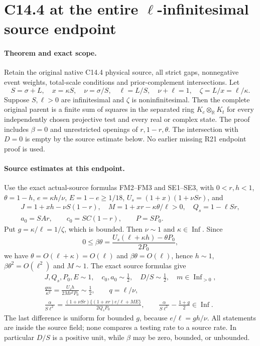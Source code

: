 \section{C14.4 at the entire $\ell$-infinitesimal source endpoint}
\label{sec:c144-ell-endpoint-rederived}

\paragraph{Theorem and exact scope.}
Retain the original native C14.4 physical source, all strict gaps,
nonnegative event weights, total-scale conditions and prior-complement
intersections.  Let
\[
 S=\sigma+L,\quad x=\kappa S,\quad
 \nu=\sigma/S,\quad\ell=L/S,\quad\nu+\ell=1,
 \quad\zeta=L/x=\ell/\kappa.
\]
Suppose $S,\ell>0$ are infinitesimal and $\zeta$ is
noninfinitesimal.  Then the complete original parent is a finite
sum of squares in the separated ring
$K_c\otimes_{\mathbb R}K_t$ for every independently chosen
projective test and every real or complex state.  The proof includes
$\beta=0$ and unrestricted openings of $r,1-r,\theta$.
The intersection with $D=0$ is empty by the source estimate below.
No earlier missing R21 endpoint proof is used.

\paragraph{Source estimates at this endpoint.}
Use the exact actual-source formulas FM2--FM3 and SE1--SE3, with
$0<r,h<1$, $\theta=1-h$, $e=\kappa h/\nu$, $E=1-e\ge1/18$,
$U_s=(1+x)(1+\nu Sr)$, and
\[
\begin{gathered}
 J=1+xh-\nu S(1-r),\quad
 M=1+xr-\kappa\theta/\ell>0,\quad Q_s=1-\ell Sr,\\
 a_0=SAr,\qquad c_0=SC(1-r),\qquad P=SP_0.
\end{gathered}
\]
Put $g=\kappa/\ell=1/\zeta$, which is bounded.
Then $\nu\sim1$ and $\kappa\in\operatorname{Inf}$.
Since
\[
 0\le\beta\theta
  =\frac{U_s(\ell+\kappa h)-\theta P_0}{2P_0},
\]
we have $\theta=O(\ell+\kappa)=O(\ell)$ and
$\beta\theta=O(\ell)$, hence $h\sim1$,
$\beta\theta^2=O(\ell^2)$ and $M\sim1$.
The exact source formulas give
\[
\begin{gathered}
 J,Q_s,P_0,E\sim1,\quad c_0,a_0\sim\tfrac12,
 \quad D/S\sim\tfrac12,\quad m\in\operatorname{Inf}_{>0},\\
 \frac{qm}{\kappa^2}
   =\frac{U_s h}{2M\nu^2P_0}\sim\tfrac12,
 \qquad q=\ell/\nu,\\
 \frac{\alpha}{S\ell^2}
   =\frac{(1+\nu Sr)\{(1+xr)e/\ell+ME\}}{2Q_sP_0},
 \qquad
 \frac{\alpha}{S\ell^2}-\frac{1+g}{2}\in\operatorname{Inf}.
\end{gathered}                                                   \tag{EL0a}
\]
The last difference is uniform for bounded $g$, because
$e/\ell=gh/\nu$.  All statements are inside the source field;
none compares a testing rate to a source rate.  In particular
$D/S$ is a positive unit, while $\beta$ may be zero, bounded,
or unbounded.

